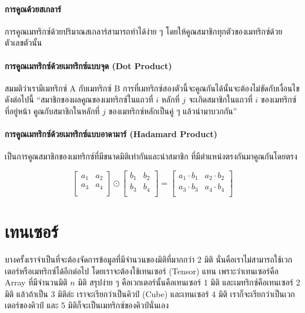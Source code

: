 \paragraph{การคูณด้วยสเกลาร์} การคูณเมทริกซ์ด้วยปริมาณสเกลาร์สามารถทำได้ง่าย ๆ โดยให้คูณสมาชิกทุกตัวของเมทริกซ์ด้วยตัวเลขตัวนั้น

\paragraph{การคูณเมทริกซ์ด้วยเมทริกซ์แบบจุด (Dot Product)}
สมมติว่าเรามีเมทริกซ์ A กับเมทริกซ์ B การที่เมทริกซ์สองตัวนี้จะคูณกันได้นั้นจะต้องไม่ขัดกับเงื่อนไขดังต่อไปนี้
\enquote{สมาชิกของผลคูณของเมทริกซ์ในแถวที่ $i$ หลักที่ $j$ จะเกิดสมาชิกในแถวที่ $i$ ของเมทริกซ์ที่อยู่หน้า คูณกับสมาชิกในหลักที่ $j$ 
ของเมทริกซ์หลักเป็นคู่ ๆ แล้วนำมาบวกกัน}

\paragraph{การคูณเมทริกซ์ด้วยเมทริกซ์แบบอาดามาร์ (Hadamard Product)} เป็นการคูณสมาชิกของเมทริกซ์ที่มีขนาดมิติเท่ากันและนำสมาชิก%
ที่มีตำแหน่งตรงกันมาคูณกันโดยตรง

\begin{equation}
    \begin{bmatrix}
    a_1 & a_2 \\
    a_3 & a_4 \\
    \end{bmatrix}
    \odot
    \begin{bmatrix}
    b_1 & b_2 \\
    b_3 & b_4 \\
    \end{bmatrix}
    =
    \begin{bmatrix}
    a_1 \cdot b_1 & a_2 \cdot b_2 \\
    a_3 \cdot b_3 & a_4 \cdot b_4 \\
\end{bmatrix}
\end{equation}

\section{เทนเซอร์}
\label{sec:tensor}

บางครั้งเราจำเป็นที่จะต้องจัดการข้อมูลที่มีจำนวนของมิติที่มากกว่า 2 มิติ นั่นคือเราไม่สามารถใช้เวกเตอร์หรือเมทริกซ์ได้อีกต่อไป
โดยเราจะต้องใช้เทนเซอร์ (Tensor) แทน เพราะว่าเทนเซอร์คือ Array ที่มีจำนวนมิติ $n$ มิติ สรุปง่าย ๆ คือเวกเตอร์นั้นคือเทนเซอร์ 1 มิติ 
และเมทริกซ์คือเทนเซอร์ 2 มิติ แล้วถ้าเป็น 3 มิติล่ะ เราจะเรียกว่าเป็นคิวป์ (Cube) และเทนเซอร์ 4 มิติ เราก็จะเรียกว่าเป็นเวกเตอร์ของคิวป์ 
และ 5 มิติก็จะเป็นเมทริกซ์ของคิวป์นั่นเอง
